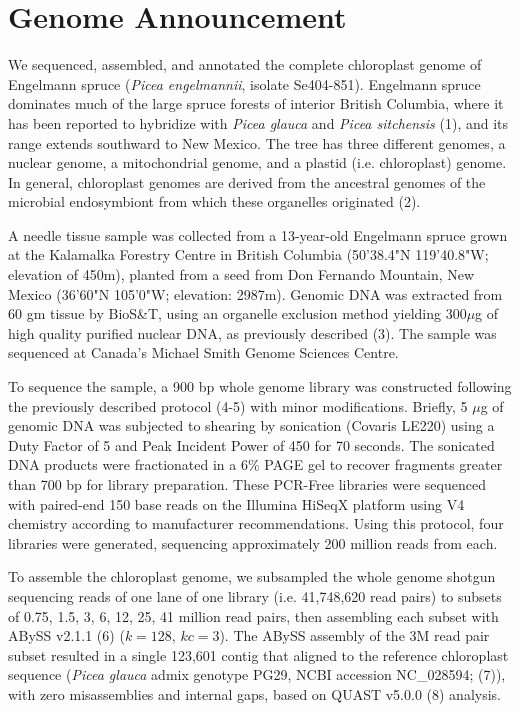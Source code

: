 \documentclass[titlepage,11pt, oneside]{article}   	%
\begin{document}
\section*{Genome Announcement}
We sequenced, assembled, and annotated the complete chloroplast genome of Engelmann spruce (\textit{Picea engelmannii}, isolate Se404-851). Engelmann spruce dominates much of the large spruce forests of interior British Columbia, where it has been reported to hybridize with \textit{Picea glauca} and \textit{Picea sitchensis} (1), and its range extends southward to New Mexico. The tree has three different genomes, a nuclear genome, a mitochondrial genome, and a plastid (i.e. chloroplast) genome. In general, chloroplast genomes are derived from the ancestral genomes of the microbial endosymbiont from which these organelles originated (2).
\newline
\par
A needle tissue sample was collected from a 13-year-old Engelmann spruce grown at the Kalamalka Forestry Centre in British Columbia (50'38.4"N 119'40.8"W; elevation of 450m), planted from a seed from Don Fernando Mountain, New Mexico (36'60"N 105'0"W; elevation: 2987m). Genomic DNA was extracted from 60 gm tissue by BioS\&T, using an organelle exclusion method yielding 300$\mu$g of high quality purified nuclear DNA, as previously described (3). The sample was sequenced at Canada’s Michael Smith Genome Sciences Centre.
\newline
\par
To sequence the sample, a 900 bp whole genome library was constructed following the previously described protocol (4-5) with minor modifications. Briefly, 5 $\mu$g of genomic DNA was subjected to shearing by sonication (Covaris LE220) using a Duty Factor of 5 and Peak Incident Power of 450 for 70 seconds. The sonicated DNA products were fractionated in a 6\% PAGE gel to recover fragments greater than 700 bp for library preparation. These PCR-Free libraries were sequenced with paired-end 150 base reads on the Illumina HiSeqX platform using V4 chemistry according to manufacturer recommendations. Using this protocol, four libraries were generated, sequencing approximately 200 million reads from each.
\newline
\par
To assemble the chloroplast genome, we subsampled the whole genome shotgun sequencing reads of one lane of one library (i.e. 41,748,620 read pairs) to subsets of 0.75, 1.5, 3, 6, 12, 25, 41 million read pairs, then assembling each subset with ABySS v2.1.1 (6) ($k=128$, $kc=3$). The ABySS assembly of the 3M read pair subset resulted in a single 123,601 contig that aligned to the reference chloroplast sequence (\textit{Picea glauca} admix genotype PG29, NCBI accession NC\_028594; (7)), with zero misassemblies and internal gaps, based on QUAST v5.0.0 (8) analysis.
\end{document}
